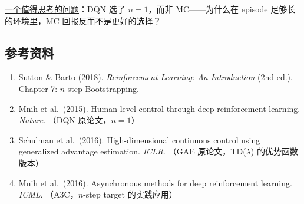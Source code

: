 \documentclass{article}
\begin{document}
\underline{一个值得思考的问题}：DQN 选了 $n=1$，而非 MC——为什么在 episode 足够长的环境里，MC 回报反而不是更好的选择？

\subsection*{参考资料}

\begin{enumerate}
  \item Sutton \& Barto (2018). \textit{Reinforcement Learning: An Introduction} (2nd ed.). Chapter 7: $n$-step Bootstrapping.
  \item Mnih et al.\ (2015). Human-level control through deep reinforcement learning. \textit{Nature}. （DQN 原论文，$n=1$）
  \item Schulman et al.\ (2016). High-dimensional continuous control using generalized advantage estimation. \textit{ICLR}. （GAE 原论文，TD($\lambda$) 的优势函数版本）
  \item Mnih et al.\ (2016). Asynchronous methods for deep reinforcement learning. \textit{ICML}. （A3C，$n$-step target 的实践应用）
\end{enumerate}
\end{document}
